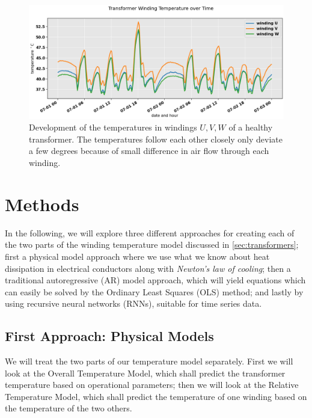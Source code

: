 \documentclass[]{article}
\begin{document}
\begin{figure}[!h]
	\centering
	\includegraphics[width=1\linewidth]{./figs/all-winding-temperature-over-time.png}
	\caption{Development of the temperatures in windings $U,V,W$ of a healthy transformer. The temperatures follow each other closely only deviate a few degrees because of small difference in air flow through each winding.}
	\label{fig:all-winding-temperature-over-time}
\end{figure}

\clearpage
\section{Methods} \label{sec:methods}

In the following, we will explore three different approaches for creating each of the two parts of the winding temperature model discussed in \ref{sec:transformers}; first a physical model approach where we use what we know about heat dissipation in electrical conductors along with \textit{Newton's law of cooling}; then a traditional autoregressive (AR) model approach, which will yield equations which can easily be solved by the Ordinary Least Squares (OLS) method; and lastly by using recursive neural networks (RNNs), suitable for time series data.

\subsection{First Approach: Physical Models} \label{sec:physical-model}
We will treat the two parts of our temperature model separately. First we will look at the Overall Temperature Model, which shall predict the transformer temperature based on operational parameters; then we will look at the Relative Temperature Model, which shall predict the temperature of one winding based on the temperature of the two others.
\end{document}
